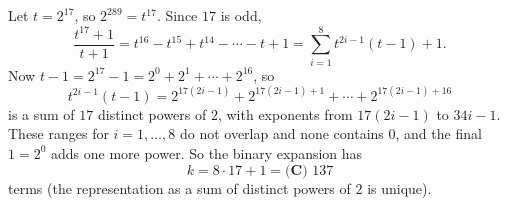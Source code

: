 Let $t=2^{17}$, so $2^{289}=t^{17}$. Since $17$ is odd,
\[\dfrac{t^{17}+1}{t+1}=t^{16}-t^{15}+t^{14}-\cdots-t+1=\sum_{i=1}^{8}t^{2i-1}(t-1)+1.\]
Now $t-1=2^{17}-1=2^0+2^1+\cdots+2^{16}$, so
\[t^{2i-1}(t-1)=2^{17(2i-1)}+2^{17(2i-1)+1}+\cdots+2^{17(2i-1)+16}\]
is a sum of $17$ distinct powers of $2$, with exponents from $17(2i-1)$ to $34i-1$. These ranges for $i=1,\dots,8$ do not overlap and none contains $0$, and the final $1=2^0$ adds one more power. So the binary expansion has
\[k=8\cdot17+1=\boxed{\textbf{(C) }137}\]
terms (the representation as a sum of distinct powers of $2$ is unique).
